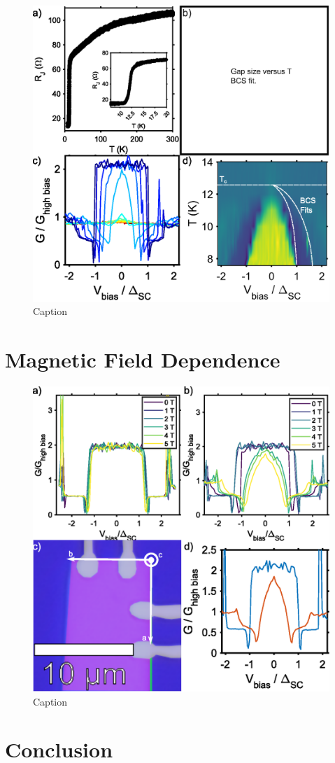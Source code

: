 \begin{figure}
    \centering
    \includegraphics[width = \textwidth]{Chap4/Figures/Temperature.eps}
    \caption{Caption}
    \label{fig:PARTemp}
\end{figure}
\section{Magnetic Field Dependence}
\begin{figure}
    \centering
    \includegraphics[width = \textwidth]{Chap4/Figures/MagneticField.eps}
    \caption{Caption}
    \label{fig:PARField}
\end{figure}
\section{Conclusion}